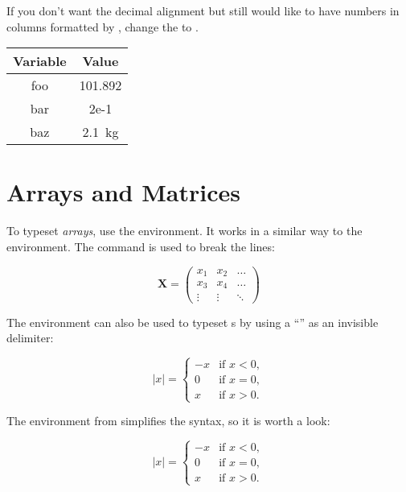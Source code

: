 If you don't want the decimal alignment but still would like to have
numbers in columns formatted by , change the
 to .
\begin{example}[examplewidth=0.45\linewidth]
\begin{tabular}{@{}cS@{}}
  \toprule
  Variable & {Value} \\
  \midrule
  foo & 101.892 \\
  bar & 2e-1 \\
  baz & \qty{2.1}{\kg}  \\
  \bottomrule
\end{tabular}
\end{example}

\section{Arrays and Matrices}%
\label{sec:arraymat}

To typeset \emph{arrays}, use the  environment. It works
in a similar way to the  environment. The \csi{\bs} command is
used to break the lines:
\begin{example}
  \begin{equation*}
    \mathbf{X} = \left( 
      \begin{array}{ccc}
        x_1 & x_2 & \ldots \\
        x_3 & x_4 & \ldots \\
        \vdots & \vdots & \ddots
      \end{array} \right)
  \end{equation*}
\end{example}

The  environment can also be used to typeset s by
using a ``'' as an invisible  delimiter:
\begin{example}
\begin{equation*}
  |x| = \left\{
    \begin{array}{rl}
      -x & \text{if } x < 0,\\
      0 & \text{if } x = 0,\\
      x & \text{if } x > 0.
    \end{array} \right.
\end{equation*}
\end{example}
The  environment from  simplifies
the syntax, so it is worth a look:
\begin{example}
  \begin{equation*}
    |x| = 
    \begin{cases}
      -x & \text{if } x < 0,\\
      0 & \text{if } x = 0,\\
      x & \text{if } x > 0.
    \end{cases} 
\end{equation*}
\end{example}

